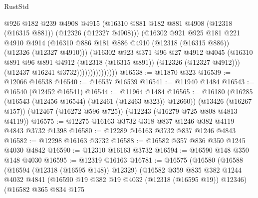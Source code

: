 \begin{lexlean}{RustStd}
\begin{coremodule}
                            @926
                            @182
                            @239
                            @4908
                            @4915
                            (@16310
                              @881
                              @182
                              @881
                              @4908
                              (@12318 (@16315 @881))
                              (@12326 (@12327 @4908)))
                            (@16302
                              @921
                              @925
                              @181
                              @221
                              @4910
                              @4914
                              (@16310
                                @886
                                @181
                                @886
                                @4910
                                (@12318 (@16315 @886))
                                (@12326 (@12327 @4910)))
                              (@16302
                                @923
                                @371
                                @96
                                @27
                                @4912
                                @4045
                                (@16310
                                  @891
                                  @96
                                  @891
                                  @4912
                                  (@12318 (@16315 @891))
                                  (@12326 (@12327 @4912)))
                                (@12437 @16241 @3732)))))))))))))))
@16538 := @11870 @323
@16539 := @12066 @16538
@16540 := @16537 @16539
@16541 := @11940 @1484
@16543 := @16540 (@12452 @16541)
@16544 := @11964 @1484
@16565 := @16180
    (@16285 (@16543 (@12456 @16544) (@12461 (@12463 @323)) @12660))
    (@13426 (@16267 @157))
    (@12467 (@16272 @596 @725))
    (@12243 (@16279 @725 @808 @4813 @4119))
@16575 := @12275 @16163 @3732 @318 @837 @1246 @382 @4119 @4843 @3732 @1398
@16580 := @12289 @16163 @3732 @837 @1246 @4843
@16582 := @12298 @16163 @3732
@16588 := @16582 @357 @836 @350 @1245 @4030 @4842
@16590 := @12310 @16163 @3732
@16594 := @16590 @148 @350 @148 @4030
@16595 := @12319 @16163
@16781 := @16575
    (@16580
      (@16588
        (@16594 (@12318 (@16595 @148)) @12329)
        (@16582
          @359
          @835
          @382
          @1244
          @4032
          @4841
          (@16590 @19 @382 @19 @4032 (@12318 (@16595 @19)) @12346)
          (@16582
            @365
            @834
            @175

\end{coremodule}
\end{lexlean}
